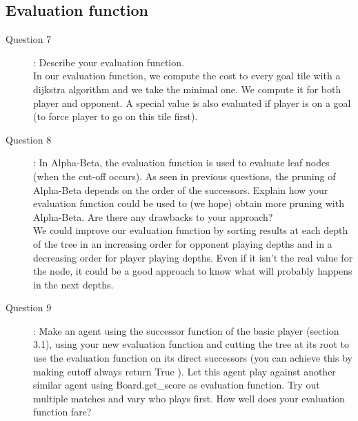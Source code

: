 \subsection{Evaluation function}
\begin{description}
\item[Question 7]: Describe your evaluation function.\\
In our evaluation function, we compute the cost to every goal tile with a dijkstra algorithm and we take the minimal one. We compute it for both player and opponent. A special value is also evaluated if player is on a goal (to force player to go on this tile first). 
\item[Question 8]: In Alpha-Beta, the evaluation function is used to evaluate leaf nodes (when the cut-off occurs). As seen in previous questions, the pruning of Alpha-Beta depends on the order of the successors. Explain how your evaluation function could be used to (we hope) obtain more pruning with Alpha-Beta. Are there any drawbacks to your approach?\\
We could improve our evaluation function by sorting results at each depth of the tree in an increasing order for opponent playing depths and in a decreasing order for player playing depths. Even if it isn't the real value for the node, it could be a good approach to know what will probably happens in the next depths. 
\item[Question 9]: Make an agent using the successor function of the basic player (section 3.1), using your new evaluation function and cutting the tree at its root to use the evaluation function on its direct successors (you can achieve this by making cutoff always return True ). Let this agent play against another similar agent using Board.get\_score as evaluation function. Try out multiple matches and vary who plays first. How well does your evaluation function fare?\\


\end{description}
